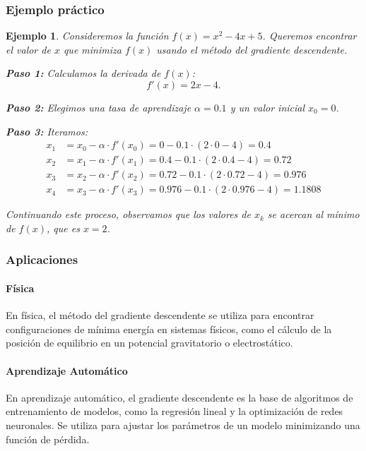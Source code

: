\documentclass[12pt, a4paper]{article}
\theoremstyle{rioplatense}
\newtheorem{ejemplo}{Ejemplo}[section]
\begin{document}
\subsubsection{Ejemplo práctico}
\begin{ejemplo}
Consideremos la función $f(x) = x^2 - 4x + 5$. Queremos encontrar el valor de $x$ que minimiza $f(x)$ usando el método del gradiente descendente.

\textbf{Paso 1:} Calculamos la derivada de $f(x)$:
\begin{equation*}
    f'(x) = 2x - 4.
\end{equation*}

\textbf{Paso 2:} Elegimos una tasa de aprendizaje $\alpha = 0.1$ y un valor inicial $x_0 = 0$.

\textbf{Paso 3:} Iteramos:
\begin{align*}
    x_1 &= x_0 - \alpha \cdot f'(x_0) = 0 - 0.1 \cdot (2 \cdot 0 - 4) = 0.4 \\
    x_2 &= x_1 - \alpha \cdot f'(x_1) = 0.4 - 0.1 \cdot (2 \cdot 0.4 - 4) = 0.72 \\
    x_3 &= x_2 - \alpha \cdot f'(x_2) = 0.72 - 0.1 \cdot (2 \cdot 0.72 - 4) = 0.976 \\
    x_4 &= x_3 - \alpha \cdot f'(x_3) = 0.976 - 0.1 \cdot (2 \cdot 0.976 - 4) = 1.1808
\end{align*}

Continuando este proceso, observamos que los valores de $x_k$ se acercan al mínimo de $f(x)$, que es $x = 2$.
\end{ejemplo}

\subsubsection{Aplicaciones}

\paragraph{Física}
En física, el método del gradiente descendente se utiliza para encontrar configuraciones de mínima energía en sistemas físicos, como el cálculo de la posición de equilibrio en un potencial gravitatorio o electrostático.

\paragraph{Aprendizaje Automático}
En aprendizaje automático, el gradiente descendente es la base de algoritmos de entrenamiento de modelos, como la regresión lineal y la optimización de redes neuronales. Se utiliza para ajustar los parámetros de un modelo minimizando una función de pérdida.
\end{document}
